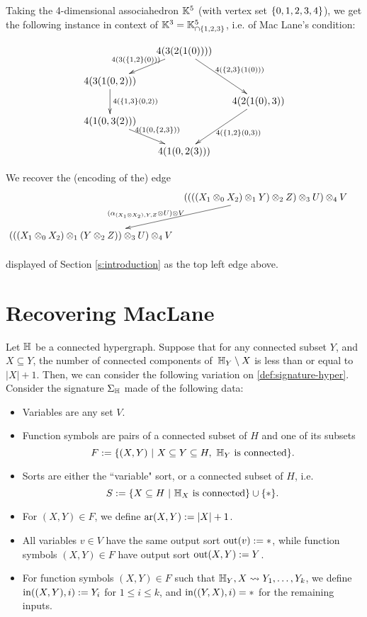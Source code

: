 Taking the 4-dimensional associahedron ${\mathbb K}^5$ (with vertex set $\left\{0,1,2,3,4\right\}$), we get the following instance in context of ${\mathbb K}^3={\mathbb K}^5_{\cap \left\{1,2,3\right\}}$, i.e. of Mac Lane's condition:
\begin{center}
$$\xymatrix @-1.65pc {&& 4(3(2(1(0)))) \ar @{->}[ddll]_{4(3(\set{1,2}(0)))} \ar @{->}[dddrr]^{4(\set{2,3}(1(0)))}&& \\
 &&&&\\
4(3(1(0,2)))  \ar @{->}[dd]^{4(\set{1,3}(0,2))}&&   && \\
 &&&&4(2(1(0),3)) \ar @{->}[dddll]^{4(\set{1,2}(0,3))}\\
 4(1(0,3(2))) \ar @{->}[ddrr]^{4(1(0,\set{2,3}))} &  &\\
 &&&&\\
 &&4(1(0,2(3)))&&}$$
\end{center}
We recover the (encoding of the) edge 
 $$
 \xymatrix @-2pc {&& ((((X_1\otimes_0 X_2)\otimes_1 Y)\otimes_2 Z)\otimes_3 U)\otimes_4 V \ar @{->}[dddddll]_(.6){(\alpha_{(X_1\otimes X_2),Y,Z}\otimes U)\otimes V\quad} && \\
 &&&&\\
 &&&&\\
  &&&&\\
    &&&&\\
( ((X_1\otimes_0 X_2)\otimes_1 (Y\otimes_2 Z))\otimes_3 U)\otimes_4 V  &&   && \\
\ }
$$
displayed of Section \ref{s:introduction} as the top left edge above.


\section{Recovering MacLane}

Let ${\mathbb H}$ be a connected hypergraph. 
Suppose that for any connected subset $Y$, and $X \subseteq Y$, the number of connected components of~${\mathbb H}_Y\setminus X$ is less than or equal to $|X|+1$.
Then, we can consider the following variation on \cref{def:signature-hyper}.
Consider the signature $\Sigma_{\mathbb H}$ made of the following data: 
\begin{itemize}
  \item Variables are any set $V$. 
  \item Function symbols are pairs of a connected subset of $H$ and one of its subsets 
  $$F:=\{(X,Y) \ | \ X \subseteq Y \subseteq H, \ {\mathbb H}_Y \text{ is connected}\}.$$
  \item Sorts are either the ``variable" sort, or a connected subset of $H$, i.e. 
  $$S:=\{ X \subseteq H \ | \ {\mathbb H}_X \text{ is connected}\}\cup\{*\}.$$
  \item For $(X,Y) \in F$, we define $\mathrm{ar}(X,Y):=|X|+1$.
  \item All variables $v \in V$ have the same output sort $\operatorname{out}(v):=*$, while function symbols $(X,Y) \in F$ have output sort $\operatorname{out}(X,Y):=Y$.
  \item For function symbols $(X,Y) \in F$ such that ${\mathbb H}_Y,X \leadsto Y_1,\ldots,Y_k$, we define $\operatorname{in}((X,Y),i):=Y_i$ for $1 \leq i \leq k$, and $\operatorname{in}((Y,X),i)=*$ for the remaining inputs.
\end{itemize}


